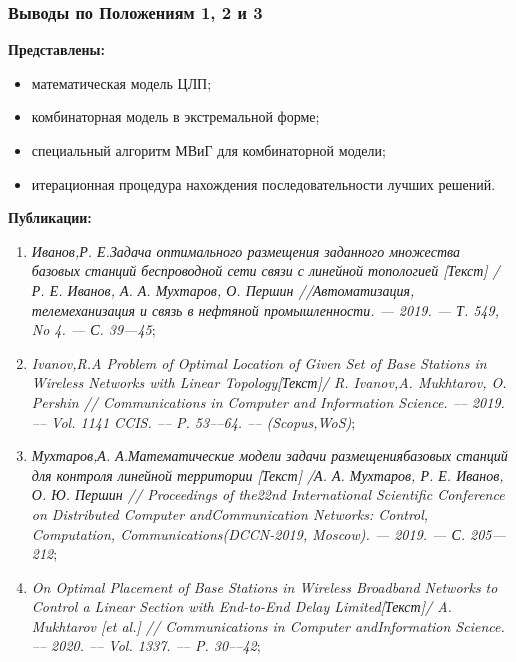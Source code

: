 \begin{frame}
    \frametitle{Выводы по Положениям 1, 2 и 3}
    \fontsize{8pt}{7.2}\selectfont

    \textbf{Представлены:}
    \begin{itemize}
        \item математическая модель ЦЛП;
        \item комбинаторная модель в экстремальной форме;
        \item специальный алгоритм МВиГ для комбинаторной модели;
        \item итерационная процедура нахождения последовательности лучших решений.
    \end{itemize}

    \bigskip
    \textbf{Публикации:}
    \begin{minipage}[c]{1\linewidth}
        \fontsize{4pt}{5.2}\selectfont
        \begin{enumerate}
            \item \textit{Иванов,Р. Е.Задача оптимального размещения заданного множе­ства базовых станций беспроводной сети связи с линейной топо­логией [Текст] / Р. Е. Иванов, А. А. Мухтаров, О. Першин //Автоматизация, телемеханизация и связь в нефтяной промышлен­ности. — 2019. — Т. 549, No 4. — С. 39—45};
            
            \item \textit{Ivanov,R.A Problem of Optimal Location of Given Set of Base Sta­tions in Wireless Networks with Linear Topology[Текст]/ R. Ivanov,A. Mukhtarov, O. Pershin // Communications in Computer and Infor­mation Science. –– 2019. –– Vol. 1141 CCIS. –– P. 53––64. –– (Scopus,WoS)};
            
            \item \textit{Мухтаров,А. А.Математические  модели  задачи  размещениябазовых станций для контроля линейной территории [Текст] /А. А. Мухтаров, Р. Е. Иванов, О. Ю. Першин // Proceedings of the22nd International Scientific Conference on Distributed Computer andCommunication Networks: Control, Computation, Communications(DCCN-2019, Moscow). — 2019. — С. 205—212};
            
            \item \textit{On Optimal Placement of Base Stations in Wireless Broadband Net­works to Control a Linear Section with End-to-End Delay Limited[Текст]/ A. Mukhtarov [et al.] // Communications in Computer andInformation Science. –– 2020. –– Vol. 1337. –– P. 30––42};
            

\end{enumerate}
\end{minipage}
\end{frame}

